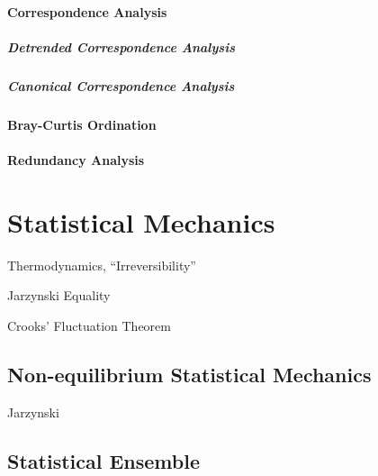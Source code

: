\paragraph{Correspondence Analysis}\label{sec:correspondence_analysis}\hfill

\subparagraph{Detrended Correspondence Analysis}
\label{sec:detrended_correspondence}\hfill

\subparagraph{Canonical Correspondence Analysis}
\label{sec:canonical_correspondence}\hfill



\paragraph{Bray-Curtis Ordination}\label{sec:bray_curtis_ordination}\hfill

\paragraph{Redundancy Analysis}\label{sec:redundancy_analysis}\hfill



\section{Statistical Mechanics}\label{sec:statistical_mechanics}

Thermodynamics, ``Irreversibility''

Jarzynski Equality

Crooks' Fluctuation Theorem



\subsection{Non-equilibrium Statistical Mechanics}
\label{sec:nonequilibrium_statistical_mechanics}

Jarzynski



\subsection{Statistical Ensemble}\label{sec:statistical_ensemble}

